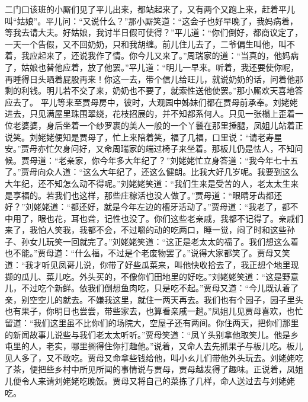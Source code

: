 \documentclass[12pt,oneside]{book}
\begin{document}
二门口该班的小厮们见了平儿出来，都站起来了，又有两个又跑上来，赶着平儿叫“姑娘”。平儿问：“又说什么？”那小厮笑道：“这会子也好早晚了，我妈病着，等我去请大夫。好姑娘，我讨半日假可使得？”平儿道：“你们倒好，都商议定了，一天一个告假，又不回奶奶，只和我胡缠。前儿住儿去了，二爷偏生叫他，叫不着，我应起来了，还说我作了情。你今儿又来了。”周瑞家的道：“当真的，他妈病了，姑娘也替他应着，放了他罢。”平儿道：“明儿一早来。听着，我还要使你呢，再睡得日头晒着屁股再来！你这一去，带个信儿给旺儿，就说奶奶的话，问着他那剩的利钱。明儿若不交了来，奶奶也不要了，就索性送他使罢。”那小厮欢天喜地答应去了。
平儿等来至贾母房中，彼时，大观园中姊妹们都在贾母前承奉。刘姥姥进去，只见满屋里珠围翠绕，花枝招展的，并不知都系何人。只见一张榻上歪着一位老婆婆，身后坐着一个纱罗裹的美人一般的一个丫鬟在那里捶腿，凤姐儿站着正说笑。刘姥姥便知是贾母了，忙上来陪着笑，福了几福，口里说：“请老寿星安。”贾母亦忙欠身问好，又命周瑞家的端过椅子来坐着。那板儿仍是怯人，不知问候。贾母道：“老亲家，你今年多大年纪了？”刘姥姥忙立身答道：“我今年七十五了。”贾母向众人道：“这么大年纪了，还这么健朗。比我大好几岁呢。我要到这么大年纪，还不知怎么动不得呢。”刘姥姥笑道：“我们生来是受苦的人，老太太生来是享福的。若我们也这样，那些庄稼活也没人做了。”贾母道：“眼睛牙齿都还好？”刘姥姥道：“都还好，就是今年左边的槽牙活动了。”贾母道：“我老了，都不中用了，眼也花，耳也聋，记性也没了。你们这些老亲戚，我都不记得了。亲戚们来了，我怕人笑我，我都不会，不过嚼的动的吃两口，睡一觉，闷了时和这些孙子、孙女儿玩笑一回就完了。”刘姥姥笑道：“这正是老太太的福了。我们想这么着也不能。”贾母道：“什么福，不过是个老废物罢了。”说得大家都笑了。贾母又笑道：“我才听见凤哥儿说，你带了好些瓜菜来，叫他快收拾去了，我正想个地里现撷的瓜儿、菜儿吃。外头买的，不像你们田地里的好吃。”刘姥姥笑道：“这是野意儿，不过吃个新鲜。依我们倒想鱼肉吃，只是吃不起。”贾母又道：“今儿既认着了亲，别空空儿的就去。不嫌我这里，就住一两天再去。我们也有个园子，园子里头也有果子，你明日也尝尝，带些家去，也算看亲戚一趟。”凤姐儿见贾母喜欢，也忙留道：“我们这里虽不比你们的场院大，空屋子还有两间。你住两天，把你们那里的新闻故事儿说些与我们老太太听听。”贾母笑道：“凤丫头别拿他取笑儿。他是乡屯里的人，老实，哪里搁得住你打趣他。”说着，又命人去先抓果子与板儿吃。板儿见人多了，又不敢吃。贾母又命拿些钱给他，叫小ㄠ儿们带他外头玩去。刘姥姥吃了茶，便把些乡村中所见所闻的事情说与贾母，贾母越发得了趣味。正说着，凤姐儿便令人来请刘姥姥吃晚饭。贾母又将自己的菜拣了几样，命人送过去与刘姥姥吃。
\end{document}
